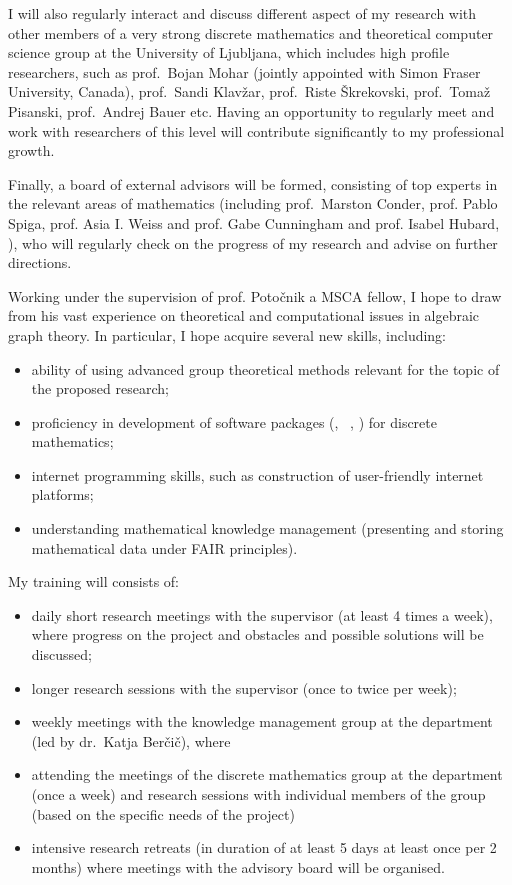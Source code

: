 I will also regularly interact and discuss different aspect of my research with other members of a very strong discrete mathematics and theoretical computer science group at the University of Ljubljana, which includes high profile researchers, such as prof.\ Bojan Mohar (jointly appointed with Simon Fraser University, Canada), prof.\ Sandi Klavžar, prof.\ Riste Škrekovski, prof.\ Tomaž Pisanski, prof.\ Andrej Bauer etc. Having an opportunity to regularly meet and work with researchers of this level will contribute significantly to my professional growth.

Finally, a board of external advisors will be formed, consisting of top experts in the relevant areas of mathematics (including prof.\ Marston Conder, prof. Pablo Spiga, prof. Asia I. Weiss and prof. Gabe Cunningham and prof. Isabel Hubard, ), who will regularly check on the progress of my research and advise on further directions.




Working under the supervision of prof. Potočnik a MSCA fellow, I hope to draw from his vast experience on theoretical and computational issues in algebraic graph theory. In particular, I hope acquire several new skills, including:
\begin{itemize}
\setlength{\itemsep}{0pt}
\item ability of using advanced group theoretical methods relevant for the topic of the proposed research;
\item proficiency in development of software packages (\gap, \sage\ , \magma) for discrete mathematics;
\item internet programming skills, such as construction of user-friendly internet platforms;
\item understanding mathematical knowledge management (presenting and storing mathematical data under FAIR principles).
\end{itemize}

My training  will consists of:
\begin{itemize}
\setlength{\itemsep}{0pt}
\item daily short research meetings with the supervisor (at least 4 times a week),
where progress on the project and obstacles and possible solutions will be discussed;
\item longer research sessions with the supervisor (once to twice per week);
\item weekly meetings with the knowledge management group at the department (led by dr.\ Katja Berčič),
where
\item attending the meetings of the discrete mathematics group at the department (once a week) and research sessions with individual members of
the group (based on the specific needs of the project)
\item  intensive research retreats (in duration of at least 5 days at least once per 2 months) where meetings with the advisory board will be organised.
\end{itemize}




